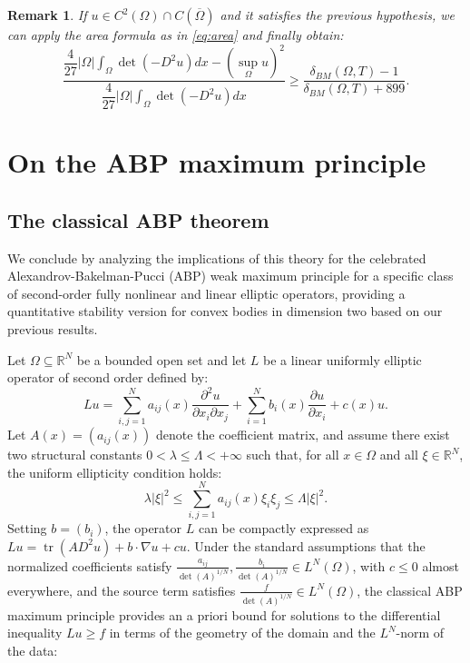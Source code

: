 \documentclass[10pt,a4paper]{amsart}
\newtheorem{remark}[theorem]{Remark}
\numberwithin{equation}{section}
\begin{document}
\begin{remark}
 If $u \in C^{2}(\Omega)\cap C(\overline{\Omega})$ and it satisfies the previous hypothesis, we can apply the area formula as in \eqref{eq:area} and finally obtain:
     \begin{equation}\label{eq:quant}
     \dfrac{\dfrac{4}{27}|\Omega|\displaystyle\int_\Omega\det (-D^2u)dx-(\sup_\Omega u)^2}{\dfrac{4}{27}|\Omega|\displaystyle\int_\Omega\det (-D^2u)dx}\geq \dfrac{\delta_{BM}(\Omega, T)-1}{\delta_{BM}(\Omega,T)+899}.
     \end{equation}
     
\end{remark}
\section{On the ABP maximum principle}

\subsection{The classical ABP theorem}

We conclude by analyzing the implications of this theory for the celebrated Alexandrov-Bakelman-Pucci (ABP) weak maximum principle for a specific class of second-order fully nonlinear and linear elliptic operators, providing a quantitative stability version for convex bodies in dimension two based on our previous results.

\noindent Let $\Omega \subseteq \mathbb{R}^N$ be a bounded open set and let $L$ be a linear uniformly elliptic operator of second order defined by:
\[
Lu = \sum_{i,j=1}^N a_{ij}(x) \frac{\partial^2 u}{\partial x_i \partial x_j} + \sum_{i=1}^N b_i(x) \frac{\partial u}{\partial x_i} + c(x)u.
\]
Let $A(x) = (a_{ij}(x))$ denote the coefficient matrix, and assume there exist two structural constants $0 < \lambda \le \Lambda < +\infty$ such that, for all $x \in \Omega$ and all $\xi \in \mathbb{R}^N$, the uniform ellipticity condition holds:
\[
\lambda|\xi|^2 \le \sum_{i,j=1}^N a_{ij}(x)\xi_i\xi_j \le \Lambda|\xi|^2.
\]
Setting $b = (b_i)$, the operator $L$ can be compactly expressed as $Lu = \operatorname{tr}(AD^2u) + b \cdot \nabla u + cu$. Under the standard assumptions that the normalized coefficients satisfy $\frac{a_{ij}}{\det(A)^{1/N}}, \frac{b_i}{\det(A)^{1/N}} \in L^N(\Omega)$, with $c \le 0$ almost everywhere, and the source term satisfies $\frac{f}{\det(A)^{1/N}} \in L^N(\Omega)$, the classical ABP maximum principle provides an a priori bound for solutions to the differential inequality $Lu \ge f$ in terms of the geometry of the domain and the $L^N$-norm of the data:
\end{document}
